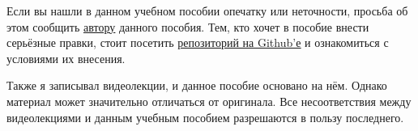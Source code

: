 \documentclass[17pt, a4paper]{extarticle}
\begin{document}

	Если вы нашли в данном учебном пособии опечатку или неточности, просьба об этом
	сообщить \href{https://vk.com/id212526330}{\underline{автору}} данного пособия.
	Тем, кто хочет в пособие внести серьёзные правки, стоит посетить
	\href{https://github.com/mu2so4/Computational-Mathematics-Book}
	{\underline{репозиторий на Github'е}} и ознакомиться с условиями их внесения.

	Также я записывал видеолекции, и данное пособие основано на нём. Однако
	материал может значительно отличаться от оригинала. Все несоответствия
	между видеолекциями и данным учебным пособием разрешаются в пользу
	последнего.
\end{document}
